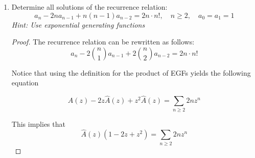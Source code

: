 \documentclass[12pt]{article}
\begin{document}
\begin{enumerate}
\begin{proof}
    $$\hat O (z) = \displaystyle ( \frac{z^2}{2}+ \frac{z^4}{4!})  \displaystyle \frac{1}{2} \displaystyle( e^z + e^{-z}) e^z $$
    
    $$ \hat O (z)= \displaystyle ( \frac{z^2}{2}+ \frac{z^4}{4!})  \displaystyle \frac{1}{2} \displaystyle( e^{2z} + 1)$$
    
    $$ \hat O(z) = \frac{1}{2}\displaystyle ( \frac{z^2 e ^{2z}}{2}+ \frac{z^4 e^{2z}}{4!})+  \frac{1}{2}\displaystyle ( \frac{z^2}{2}+ \frac{z^4}{4!})$$
    
    Let us recall that $\displaystyle \left [\frac{z^n}{n!} \right] \hat F \cdot  \hat G = \displaystyle \sum \limits_{k\geq 0}^{n} { n \choose k} \displaystyle \left [\frac{z^k}{k!}\right ] \hat F \cdot \left [\frac{z^{n-k}}{(n-k)!}\right ] \hat G  $
    
    Notice that since $\displaystyle\left[\frac{z^k}{k!}\right ] \frac{z^2}{2}$ is only different from $0$ when $k=2$
    and  $\displaystyle\left[\frac{z^k}{k!}\right ] \frac{z^4}{4!}$ is only different from $0$ when $k=4$, then $\displaystyle\left[\frac{z^n}{n!}\right ] \frac{z^2 e ^{2z}}{2} = {n \choose 2} 2^{n-2}$ and $\displaystyle\left[\frac{z^n}{n!}\right ] \frac{z^4 e ^{2z}}{4!} = {n \choose 4} 2^{n-4}$
    
    Therefore $O(n) = \begin{cases}
1/2 +  {n \choose 2 } 2^{n-3} +  {n \choose 4 } 2^{n-5} \textrm{ if } n= 2,4 \\
 {n \choose 2 } 2^{n-3} +  {n \choose 4 } 2^{n-5} \textrm{ otherwise}\\
\end{cases}$

\end{proof}

\item Determine all solutions of the recurrence relation:
$$ a_n -2n a_{n-1} +n(n-1)a_{n-2} = 2n \cdot n!, \quad n \geq 2,\quad a_0 = a_1 = 1$$
\textit{Hint: Use exponential generating functions}

\begin{proof}
    The recurrence relation can be rewritten as follows:
    $$ a_n - 2 {n\choose 1} a_{n-1} + 2 {n \choose 2} a_{n-2} = 2n \cdot n!$$
    
    
    Notice that using the definition for the product of EGFs yields the following equation
    
    $$\hat A(z) - 2 z \hat A(z) +  z^2 \hat A (z) = \displaystyle \sum \limits_{n \geq 2} 2n z^n $$
    
    This implies that $$ \hat A(z) (1-2z+z^2) = \displaystyle \sum \limits_{n \geq 2} 2n z^n$$
    

\end{proof}
\end{enumerate}
\end{document}
